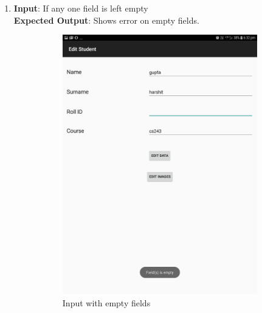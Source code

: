 \documentclass{scrreprt}
\begin{document}
\begin{itemize}
\begin{enumerate}
\item \textbf{Input}: If any one field is left empty\\
\textbf{Expected Output}: Shows error on empty fields.
\begin{figure}[H]
\begin{subfigure}{0.5\textwidth}
\includegraphics[width=0.85\linewidth, keepaspectratio]{editempty1.jpg} 
\caption{Input with empty fields}
\label{fig:subim1}
\end{subfigure}
\begin{subfigure}{0.5\textwidth}

\end{subfigure}
\end{figure}
\end{enumerate}
\end{itemize}
\end{document}
